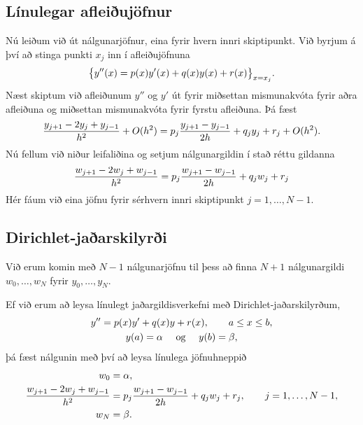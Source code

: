 \documentclass[letterpaper,10pt,icelandic]{sphinxmanual}
\begin{document}

\subsection{Línulegar afleiðujöfnur}
\label{kafli07:index-3}\label{kafli07:linulegar-afleiujofnur}
Nú leiðum við út nálgunarjöfnur, eina fyrir hvern innri skiptipunkt. Við
byrjum á því að stinga punkti \(x_j\) inn í afleiðujöfnuna
\begin{gather}
\begin{split}\big\{ y''(x)= p(x)y'(x)+q(x)y(x) + r(x)\big\}_{x=x_j}.\end{split}\notag
\end{gather}
Næst skiptum við afleiðunum \(y''\) og \(y'\) út fyrir
miðsettan mismunakvóta fyrir aðra afleiðuna og
miðsettan mismunakvóta fyrir fyrstu afleiðuna. Þá fæst
\begin{gather}
\begin{split}\dfrac{y_{j+1}-2y_j+y_{j-1}}{h^2} +O(h^2)
=p_j\dfrac{y_{j+1}-y_{j-1}}{2h}+q_jy_j+r_j+ O(h^2).\end{split}\notag
\end{gather}
Nú fellum við niður leifaliðina og setjum nálgunargildin í stað réttu
gildanna
\begin{gather}
\begin{split}\dfrac{w_{j+1}-2w_j+w_{j-1}}{h^2}
=p_j\dfrac{w_{j+1}-w_{j-1}}{2h}+q_jw_j+r_j\end{split}\notag
\end{gather}
Hér fáum við eina jöfnu fyrir sérhvern innri skiptipunkt
\(j=1,\dots,N-1\).


\subsection{Dirichlet-jaðarskilyrði}
\label{kafli07:id2}
Við erum komin með \(N-1\) nálgunarjöfnu til þess að finna
\(N+1\) nálgunargildi \(w_0,\dots,w_N\) fyrir
\(y_0,\dots,y_N\).

Ef við erum að leysa línulegt jaðargildisverkefni með
Dirichlet-jaðarskilyrðum,
\begin{gather}
\begin{split}\begin{gathered}
    y''=p(x)y'+q(x)y+r(x), \qquad a\leq x\leq b,\\
y(a)=\alpha \quad \text{ og } \quad y(b)=\beta,
  \end{gathered}\end{split}\notag
\end{gather}
þá fæst nálgunin með því að leysa línulega jöfnuhneppið
\begin{gather}
\begin{split}\begin{aligned}
w_0&=\alpha,\\
\dfrac{w_{j+1}-2w_j+w_{j-1}}{h^2}
&=p_j\dfrac{w_{j+1}-w_{j-1}}{2h}+q_jw_j+r_j, \qquad j=1,\dots,N-1,\\
w_N&=\beta.  \end{aligned}\end{split}\notag
\end{gather}
\end{document}

